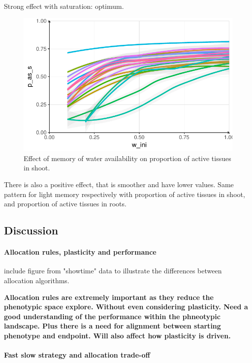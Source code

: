 Strong effect with saturation: optimum. 

\begin{figure}\label{fig:w_ini_p_as_s}
\includegraphics[width = \textwidth]{./2_PP/Figures/w_ini_p_as_s.pdf}
\caption{Effect of memory of water availability on proportion of active tissues in shoot.}
\end{figure}
There is also a positive effect, that is smoother and have lower values. Same pattern for light memory respectively with proportion of active tissues in shoot, and proportion of active tissues in roots.


\subsection{Discussion}
\paragraph{Allocation rules, plasticity and performance}

include figure from "showtime" data to illustrate the differences between allocation algorithms.

\textbf{Allocation rules are extremely important as they reduce the phenotypic space explore. Without even considering plasticity. Need a good understanding of the performance within the phneotypic landscape. Plus there is a need for alignment between starting phenotype and endpoint. Will also affect how plasticity is driven.}

\paragraph{Fast slow strategy and allocation trade-off}

